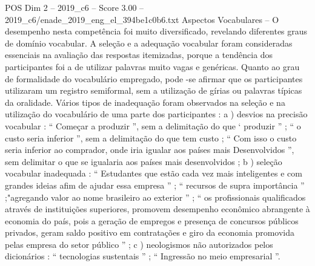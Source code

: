 \begin{textsample}{POS Dim 2 – 2019\_c6 – Score 3.00 – 2019\_c6/enade\_2019\_eng\_el\_394be1c0b6.txt}
Aspectos Vocabulares – O desempenho nesta competência foi muito diversificado, revelando diferentes graus de domínio vocabular.
A seleção e a adequação vocabular foram consideradas essenciais na avaliação das respostas itemizadas, porque a tendência dos participantes foi a de utilizar palavras muito vagas e genéricas.
Quanto ao grau de formalidade do vocabulário empregado, pode -se afirmar que os participantes utilizaram um registro semiformal, sem a utilização de gírias ou palavras típicas da oralidade.
Vários tipos de inadequação foram observados na seleção e na utilização do vocabulário de uma parte dos participantes : a ) desvios na precisão vocabular : “ Começar a produzir ”, sem a delimitação do que ‘ produzir ” ; “ o custo seria inferior ”, sem a delimitação do que tem custo ; “ Com isso o custo seria inferior ao comprador, onde iria igualar aos países mais Desenvolvidos ”, sem delimitar o que se igualaria aos países mais desenvolvidos ; b ) seleção vocabular inadequada : “ Estudantes que estão cada vez mais inteligentes e com grandes ideias afim de ajudar essa empresa ” ; “ recursos de supra importância ” ;"agregando valor ao nome brasileiro ao exterior ” ; “ os profissionais qualificados através de instituições superiores, promovem desempenho econômico abrangente à economia do país, pois a geração de empregos e presença de concursos públicos privados, geram saldo positivo em contratações e giro da economia promovida pelas empresa do setor público ” ; c ) neologismos não autorizados pelos dicionários : “ tecnologias sustentais ” ; “ Ingressão no meio empresarial ”.

\end{textsample}
